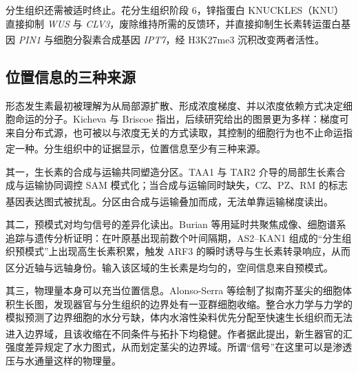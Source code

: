 \documentclass[11pt,a4paper]{ctexart}
\begin{document}
分生组织还需被适时终止。花分生组织阶段 6，锌指蛋白 KNUCKLES（KNU）直接抑制 \textit{WUS} 与 \textit{CLV3}，废除维持所需的反馈环，并直接抑制生长素转运蛋白基因 \textit{PIN1} 与细胞分裂素合成基因 \textit{IPT7}，经 H3K27me3 沉积改变两者活性\textsuperscript{\cite{ref8}}。

\subsection{位置信息的三种来源}

形态发生素最初被理解为从局部源扩散、形成浓度梯度、并以浓度依赖方式决定细胞命运的分子。Kicheva 与 Briscoe 指出，后续研究给出的图景更为多样：梯度可来自分布式源，也可被以与浓度无关的方式读取，其控制的细胞行为也不止命运指定一种\textsuperscript{\cite{ref9}}。分生组织中的证据显示，位置信息至少有三种来源。

其一，生长素的合成与运输共同塑造分区。TAA1 与 TAR2 介导的局部生长素合成与运输协同调控 SAM 模式化；当合成与运输同时缺失，CZ、PZ、RM 的标志基因表达图式被扰乱\textsuperscript{\cite{ref2}}。分区由合成与运输叠加而成，无法单靠运输梯度读出。

其二，预模式对均匀信号的差异化读出。Burian 等用延时共聚焦成像、细胞谱系追踪与遗传分析证明：在叶原基出现前数个叶间隔期，AS2–KAN1 组成的“分生组织预模式”上出现高生长素积累，触发 ARF3 的瞬时诱导与生长素转录响应，从而区分近轴与远轴身份\textsuperscript{\cite{ref10}}。输入该区域的生长素是均匀的，空间信息来自预模式。

其三，物理量本身可以充当位置信息。Alonso-Serra 等绘制了拟南芥茎尖的细胞体积生长图，发现器官与分生组织的边界处有一亚群细胞收缩。整合水力学与力学的模拟预测了边界细胞的水分亏缺，体内水溶性染料优先分配至快速生长组织而无法进入边界域，且该收缩在不同条件与拓扑下均稳健\textsuperscript{\cite{ref11}}。作者据此提出，新生器官的汇强度差异规定了水力图式，从而划定茎尖的边界域。所谓“信号”在这里可以是渗透压与水通量这样的物理量。
\end{document}
